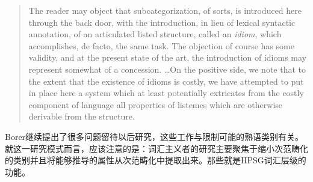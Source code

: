 \begin{exe}
\begin{xlist}[iv.]
\begin{exe}
\begin{xlist}[iv.]
\begin{quotation}
{The reader may object that subcategorization, of sorts, is introduced here through the back door, with the introduction, in lieu of lexical syntactic annotation, of an articulated listed structure, called an \emph{idiom}, which accomplishes, de facto, the same task.  The objection of course has some validity, and at the present state of the art, the introduction of idioms may represent somewhat of a concession. 
\ldots  On the positive side, we note that to the extent that the existence of idioms is costly, we have attempted to put in place here a system which at least potentially extricates from the costly component of language all properties of listemes which are otherwise derivable from the structure.
}
\end{quotation}
Borer继续提出了很多问题留待以后研究，这些工作与限制可能的熟语类别有关。就这一研究模式而言，应该注意的是：词汇主义者的研究主要聚焦于缩小次范畴化的类别并且将能够推导的属性从次范畴化中提取出来。那些就是HPSG词汇层级的功能。
%


\end{xlist}
\end{exe}
\end{xlist}
\end{exe}
